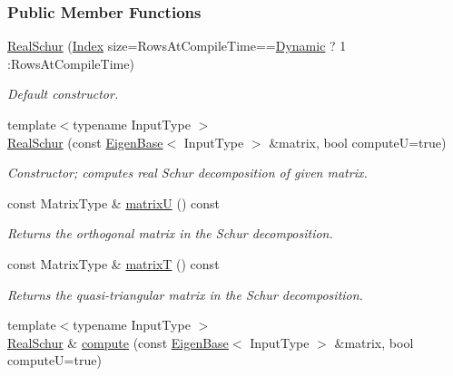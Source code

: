 \subsubsection*{Public Member Functions}
\begin{DoxyCompactItemize}
\item 
\hyperlink{group___eigenvalues___module_a826c83e2f1d4c8332606a14ea121ff5f}{Real\+Schur} (\hyperlink{group___eigenvalues___module_a8bd4653e2d9569a44ecc95e746422d3f}{Index} size=Rows\+At\+Compile\+Time==\hyperlink{namespace_eigen_ad81fa7195215a0ce30017dfac309f0b2}{Dynamic} ? 1 \+:Rows\+At\+Compile\+Time)
\begin{DoxyCompactList}\small\item\em Default constructor. \end{DoxyCompactList}\item 
{\footnotesize template$<$typename Input\+Type $>$ }\\\hyperlink{group___eigenvalues___module_afef4d3dc5a493aca2760c20b34337016}{Real\+Schur} (const \hyperlink{group___core___module_struct_eigen_1_1_eigen_base}{Eigen\+Base}$<$ Input\+Type $>$ \&matrix, bool computeU=true)
\begin{DoxyCompactList}\small\item\em Constructor; computes real Schur decomposition of given matrix. \end{DoxyCompactList}\item 
const Matrix\+Type \& \hyperlink{group___eigenvalues___module_a85622ccbecff99c8933d21f0a22b22bb}{matrixU} () const
\begin{DoxyCompactList}\small\item\em Returns the orthogonal matrix in the Schur decomposition. \end{DoxyCompactList}\item 
const Matrix\+Type \& \hyperlink{group___eigenvalues___module_abb78996b43b8642a5f507415730445cb}{matrixT} () const
\begin{DoxyCompactList}\small\item\em Returns the quasi-\/triangular matrix in the Schur decomposition. \end{DoxyCompactList}\item 
{\footnotesize template$<$typename Input\+Type $>$ }\\\hyperlink{group___eigenvalues___module_class_eigen_1_1_real_schur}{Real\+Schur} \& \hyperlink{group___eigenvalues___module_a60caf9ffad11d728ea458c4dd36d0a98}{compute} (const \hyperlink{group___core___module_struct_eigen_1_1_eigen_base}{Eigen\+Base}$<$ Input\+Type $>$ \&matrix, bool computeU=true)

\end{DoxyCompactItemize}
